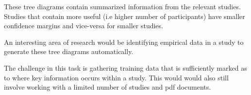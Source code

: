 These tree diagrams contain summarized information from the relevant studies. Studies that contain more useful (i.e higher number of participants) have smaller confidence margins and vice-versa for smaller studies.

An interesting area of research would be identifying empirical data in a study to generate these tree diagrams automatically.

The challenge in this task is gathering training data that is sufficiently marked as to where key information occurs within a study. This would would also still involve working with a limited number of studies and pdf documents.


